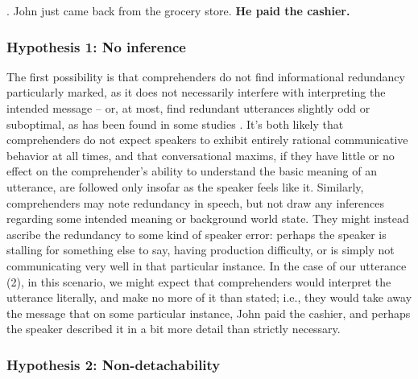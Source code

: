 \ex. John just came back from the grocery store. \textbf{He paid the
  cashier.}

\subsubsection{Hypothesis 1: No
inference}\label{hypothesis-1-no-inference}

The first possibility is that comprehenders do not find informational
redundancy particularly marked, as it does not necessarily interfere
with interpreting the intended message -- or, at most, find redundant
utterances slightly odd or suboptimal, as has been found in some studies
\citep{Davies2010}. It's both likely that comprehenders do not
expect speakers to exhibit entirely rational communicative behavior at
all times, and that conversational maxims, if they have little or no
effect on the comprehender's ability to understand the basic meaning of
an utterance, are followed only insofar as the speaker feels like it.
Similarly, comprehenders may note redundancy in speech, but not draw any
inferences regarding some intended meaning or background world state.
They might instead ascribe the redundancy to some kind of speaker error:
perhaps the speaker is stalling for something else to say, having
production difficulty, or is simply not communicating very well in that
particular instance. In the case of our utterance (2), in this scenario,
we might expect that comprehenders would interpret the utterance
literally, and make no more of it than stated; i.e., they would take
away the message that on some particular instance, John paid the
cashier, and perhaps the speaker described it in a bit more detail than
strictly necessary.

\subsubsection{Hypothesis 2:
Non-detachability}\label{hypothesis-2-non-detachability}

